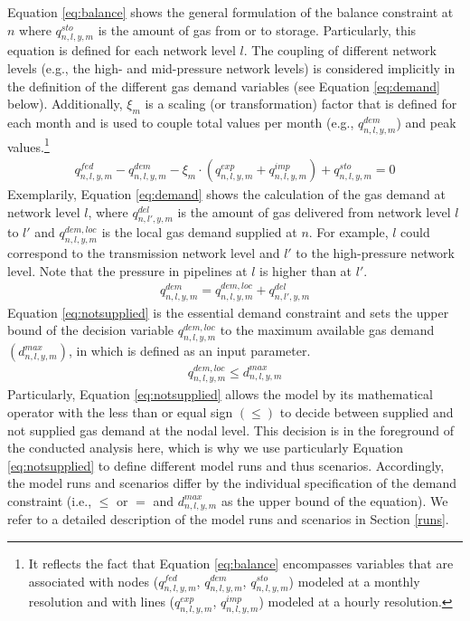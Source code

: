 Equation \ref{eq:balance} shows the general formulation of the balance constraint at $n$ where $q^{sto}_{n,l,y,m}$ is the amount of gas from or to storage. Particularly, this equation is defined for each network level $l$. The coupling of different network levels (e.g., the high- and mid-pressure network levels) is considered implicitly in the definition of the different gas demand variables (see Equation \ref{eq:demand} below). Additionally,  $\xi_m$ is a scaling (or transformation) factor that is defined for each month and is used to couple total values per month (e.g., $q^{dem}_{n,l,y,m}$) and peak values.\footnote{It reflects the fact that Equation \ref{eq:balance} encompasses variables that are associated with nodes ($q^{fed}_{n,l,y,m}$, $q^{dem}_{n,l,y,m}$, $q^{sto}_{n,l,y,m}$) modeled at a monthly resolution and with lines ($q^{exp}_{n,l,y,m}$, $q^{imp}_{n,l,y,m}$) modeled at a hourly resolution.}
\begin{align}\label{eq:balance}
	q^{fed}_{n,l,y,m} - q^{dem}_{n,l,y,m} - \xi_m \cdot \left(q^{exp}_{n,l,y,m} + q^{imp}_{n,l,y,m}\right) + q^{sto}_{n,l,y,m}= 0
\end{align}
Exemplarily, Equation \ref{eq:demand} shows the calculation of the gas demand at network level $l$, where $q^{del}_{n,l',y,m}$ is the amount of gas delivered from network level $l$ to $l'$ and $q^{dem,loc}_{n,l,y,m}$ is the local gas demand supplied at $n$. For example, $l$ could correspond to the transmission network level and $l'$ to the high-pressure network level. Note that the pressure in pipelines at $l$ is higher than at $l'$.
\begin{align}\label{eq:demand}
	q^{dem}_{n,l,y,m} = q^{dem,loc}_{n,l,y,m} + q^{del}_{n,l',y,m}
\end{align}
Equation \ref{eq:notsupplied} is the essential demand constraint and sets the upper bound of the decision variable $q^{dem,loc}_{n,l,y,m}$ to the maximum available gas demand $(d^{max}_{n,l,y,m})$, in which is defined as an input parameter. 
\begin{align}\label{eq:notsupplied}
	q^{dem,loc}_{n,l,y,m} \leq d^{max}_{n,l,y,m}
\end{align}
Particularly, Equation \ref{eq:notsupplied} allows the model by its mathematical operator with the less than or equal sign $(\leq)$ to decide between supplied and not supplied gas demand at the nodal level. This decision is in the foreground of the conducted analysis here, which is why we use particularly Equation \ref{eq:notsupplied} to define different model runs and thus scenarios. Accordingly, the model runs and scenarios differ by the individual specification of the demand constraint (i.e., $\leq$ or $=$ and $d^{max}_{n,l,y,m}$ as the upper bound of the equation). We refer to a detailed description of the model runs and scenarios in Section \ref{runs}.\vspace{0.3cm}


